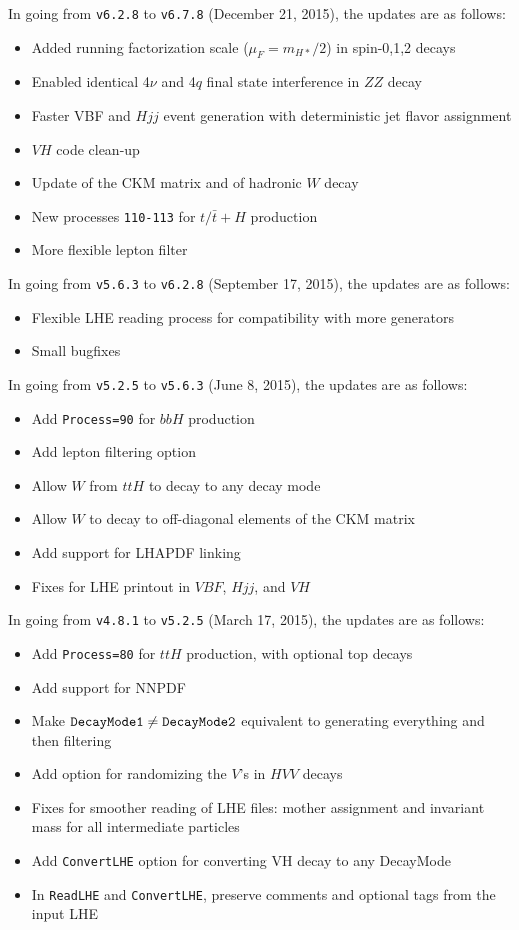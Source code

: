 \documentclass[aps,superscriptaddress,nofootinbib]{revtex4}
\begin{document}
\noindent
In going from \verb|v6.2.8| to \verb|v6.7.8| (December 21, 2015), the updates are as follows:
\begin{itemize}
\item Added running factorization scale ($\mu_F=m_{H*}/2$) in spin-0,1,2 decays
\item Enabled identical 4$\nu$ and 4$q$ final state interference in $ZZ$ decay
\item Faster VBF and $Hjj$ event generation with deterministic jet flavor assignment
\item $VH$ code clean-up
\item Update of the CKM matrix and of hadronic $W$ decay
\item New processes \verb|110-113| for $t/\bar{t}+H$ production
\item More flexible lepton filter
\end{itemize}
\noindent
In going from \verb|v5.6.3| to \verb|v6.2.8| (September 17, 2015), the updates are as follows:
\begin{itemize}
\item Flexible LHE reading process for compatibility with more generators
\item Small bugfixes
\end{itemize}
\noindent
In going from \verb|v5.2.5| to \verb|v5.6.3| (June 8, 2015), the updates are as follows:
\begin{itemize}
\item Add \verb|Process=90| for $bbH$ production
\item Add lepton filtering option
\item Allow $W$ from $ttH$ to decay to any decay mode
\item Allow $W$ to decay to off-diagonal elements of the CKM matrix
\item Add support for LHAPDF linking
\item Fixes for LHE printout in $VBF$, $Hjj$, and $VH$
\end{itemize}
\noindent
In going from \verb|v4.8.1| to \verb|v5.2.5| (March 17, 2015), the updates are as follows:
\begin{itemize}
\item Add \verb|Process=80| for $ttH$ production, with optional top decays
\item Add support for NNPDF
\item Make $\verb|DecayMode1|\ne\verb|DecayMode2|$ equivalent to generating everything and then filtering
\item Add option for randomizing the $V$'s in $HVV$ decays
\item Fixes for smoother reading of LHE files: mother assignment and invariant mass for all intermediate particles
\item Add \verb|ConvertLHE| option for converting VH decay to any DecayMode
\item In \verb|ReadLHE| and \verb|ConvertLHE|, preserve comments and optional tags from the input LHE
\end{itemize}
\end{document}
